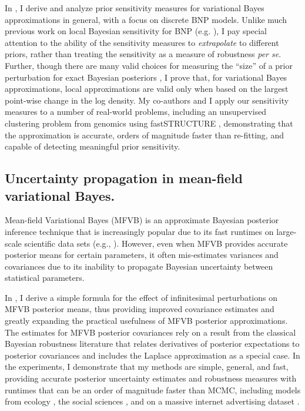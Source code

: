 In \citet{giordano:2021:bnpsensitivity}, I derive and analyze prior sensitivity
measures for variational Bayes approximations in general, with a focus on
discrete BNP models. Unlike much previous work on local Bayesian sensitivity for
BNP (e.g. \citet{Basu:2000:BNP_robustness}), I pay special attention to the
ability of the sensitivity measures to \emph{extrapolate} to different priors,
rather than treating the sensitivity as a measure of robustness \textit{per se}.
Further, though there are many valid choices for measuring the ``size'' of a
prior perturbation for exact Bayesian posteriors
\citep{gustafson:1996:localposterior}, I prove that, for variational Bayes
approximations, local approximations are valid only when based on the largest
point-wise change in the log density.  My co-authors and I apply our sensitivity
measures to a number of real-world problems, including an unsupervised
clustering problem from genomics using fastSTRUCTURE
\citep{raj:2014:faststructure}, demonstrating that the approximation is
accurate, orders of magnitude faster than re-fitting, and capable of detecting
meaningful prior sensitivity.

\subsection*{Uncertainty propagation in mean-field variational Bayes.}

Mean-field Variational Bayes (MFVB) is an approximate Bayesian posterior
inference technique that is increasingly popular due to its fast runtimes on
large-scale scientific data sets (e.g., \citet{raj:2014:faststructure,
kucukelbir:2017:advi, regier:2019:cataloging}). However, even when MFVB provides
accurate posterior means for certain parameters, it often mis-estimates
variances and covariances \citep{wang:2005:inadequacy, turner:2011:two} due to
its inability to propagate Bayesian uncertainty between statistical parameters.

In \citet{giordano:2015:linear, giordano:2018:covariances}, I derive a simple
formula for the effect of infinitesimal perturbations on MFVB posterior means,
thus providing improved covariance estimates and greatly expanding the practical
usefulness of MFVB posterior approximations. The estimates for MFVB posterior
covariances rely on a result from the classical Bayesian robustness literature
that relates derivatives of posterior expectations to posterior covariances and
includes the Laplace approximation as a special case.
In the experiments, I demonstrate that my methods are simple, general, and
fast, providing accurate posterior uncertainty estimates and robustness measures
with runtimes that can be an order of magnitude faster than MCMC, including
models from ecology \citep{kery:2011:bayesian}, the social sciences
\citep{gelman:2006:arm}, and on a massive internet advertising dataset
\citep{criteo:2014:dataset}.



